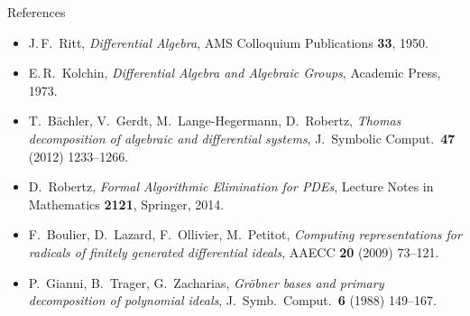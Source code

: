 \documentclass[10pt,aspectratio=169]{beamer}
\begin{document}
\begin{frame}{References}
\footnotesize
\begin{itemize}
  \item J.\,F.~Ritt, \emph{Differential Algebra}, AMS Colloquium Publications
        \textbf{33}, 1950.
  \item E.\,R.~Kolchin, \emph{Differential Algebra and Algebraic Groups},
        Academic Press, 1973.
  \item T.~B\"achler, V.~Gerdt, M.~Lange-Hegermann, D.~Robertz,
        \emph{Thomas decomposition of algebraic and differential systems},
        J.~Symbolic Comput.\ \textbf{47} (2012) 1233--1266.
  \item D.~Robertz, \emph{Formal Algorithmic Elimination for PDEs}, Lecture Notes
        in Mathematics \textbf{2121}, Springer, 2014.
  \item F.~Boulier, D.~Lazard, F.~Ollivier, M.~Petitot, \emph{Computing
        representations for radicals of finitely generated differential ideals},
        AAECC \textbf{20} (2009) 73--121.
  \item P.~Gianni, B.~Trager, G.~Zacharias, \emph{Gr\"obner bases and primary
        decomposition of polynomial ideals}, J.~Symb.\ Comput.\ \textbf{6} (1988)
        149--167.
\end{itemize}
\end{frame}
\end{document}
